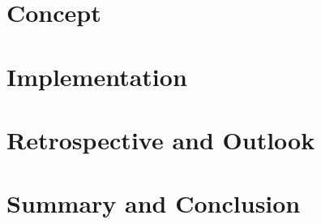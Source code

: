 \documentclass{clbthesis}
\begin{document}
\chapter{Concept}							%


\chapter{Implementation}						%


\chapter{Retrospective and Outlook} 			%


\chapter{Summary and Conclusion}				%




\cleardoublepage
{}
{}\listoffigures

\listoftables

\glsaddall
\printglossaries

\appendix

% 
\end{document}
